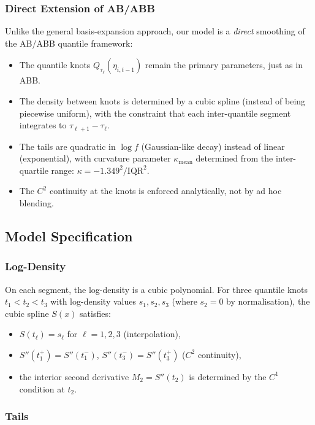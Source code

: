 \documentclass[12pt]{article}
\begin{document}
\subsubsection*{Direct Extension of AB/ABB}

Unlike the general basis-expansion approach, our model is a \emph{direct}
smoothing of the AB/ABB quantile framework:
\begin{itemize}
\item The quantile knots $Q_{\tau_\ell}(\eta_{i,t-1})$ remain the primary
  parameters, just as in ABB.
\item The density between knots is determined by a cubic spline
  (instead of being piecewise uniform), with the constraint that each
  inter-quantile segment integrates to $\tau_{\ell+1} - \tau_\ell$.
\item The tails are quadratic in $\log f$ (Gaussian-like decay) instead of
  linear (exponential), with curvature parameter $\kappa_{\text{mean}}$
  determined from the inter-quartile range: $\kappa = -1.349^2 / \text{IQR}^2$.
\item The $C^2$ continuity at the knots is enforced analytically, not by
  ad hoc blending.
\end{itemize}

\subsection{Model Specification}

\subsubsection*{Log-Density}

On each segment, the log-density is a cubic polynomial.
For three quantile knots $t_1 < t_2 < t_3$ with log-density values
$s_1, s_2, s_3$ (where $s_2 = 0$ by normalisation), the cubic spline
$S(x)$ satisfies:
\begin{itemize}
\item $S(t_\ell) = s_\ell$ for $\ell = 1, 2, 3$ (interpolation),
\item $S''(t_1^+) = S''(t_1^-)$, $S''(t_3^-) = S''(t_3^+)$ ($C^2$ continuity),
\item the interior second derivative $M_2 = S''(t_2)$ is determined by
  the $C^1$ condition at $t_2$.
\end{itemize}

\subsubsection*{Tails}
\end{document}
